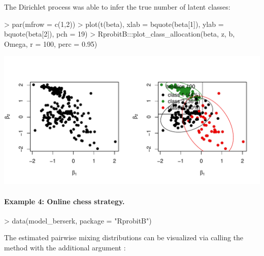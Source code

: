 \documentclass[article]{jss}
\newcommand{\fct}[1]{\code{#1()}}
\begin{document}
\begin{Schunk}
\end{Schunk}

The Dirichlet process was able to infer the true number  of latent classes:

\begin{Schunk}
\begin{Sinput}
> par(mfrow = c(1,2))
> plot(t(beta), xlab = bquote(beta[1]), ylab = bquote(beta[2]), pch = 19)
> RprobitB:::plot_class_allocation(beta, z, b, Omega, r = 100, perc = 0.95)
\end{Sinput}
\end{Schunk}
\includegraphics{rprobitb_oelschlaeger_bauer-dp-example}

\paragraph{Example 4: Online chess strategy.}

\begin{Schunk}
\begin{Sinput}
> data(model_berserk, package = "RprobitB")
\end{Sinput}
\end{Schunk}

The estimated pairwise mixing distributions can be visualized via calling the \fct{plot} method with the additional argument :
\end{document}
